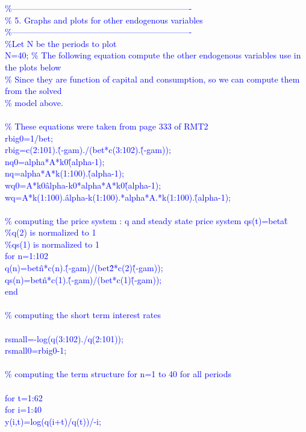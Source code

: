 \documentclass[a4paper,12pt]{scrartcl} %
\begin{document}
\textcolor{blue}{
\%----------------------------------------------------------------\\
\% 5. Graphs and plots for other endogenous variables\\
\%----------------------------------------------------------------\\
\%Let N be the periods to plot\\
N=40;
\% The following equation compute the other endogenous variables use in the plots below\\
\% Since they are function of capital and consumption, so we can compute them from the solved\\
\% model above.\\
\\
\% These equations were taken from page 333 of RMT2\\
rbig0=1/bet;\\
rbig=c(2:101).\^(-gam)./(bet*c(3:102).\^(-gam));\\
nq0=alpha*A*k0\^(alpha-1);\\
nq=alpha*A*k(1:100).\^(alpha-1);\\
wq0=A*k0\^alpha-k0*alpha*A*k0\^(alpha-1);\\
wq=A*k(1:100).\^alpha-k(1:100).*alpha*A.*k(1:100).\^(alpha-1);\\
\\
\% computing the price system : q and steady state price system qs(t)=beta\^t\\
\%q(2) is normalized to 1\\
\%qs(1) is normalized to 1\\
for n=1:102\\
q(n)=bet\^n*c(n).\^(-gam)/(bet\^2*c(2)\^(-gam));\\
qs(n)=bet\^n*c(1).\^(-gam)/(bet*c(1)\^(-gam));\\
end\\
\\
\% computing the short term interest rates\\
\\
rsmall=-log(q(3:102)./q(2:101));\\
rsmall0=rbig0-1;\\
\\
\% computing the term structure for n=1 to 40 for all periods\\
\\
for t=1:62\\
for i=1:40\\
y(i,t)=log(q(i+t)/q(t))/-i;\\
}
\end{document}
